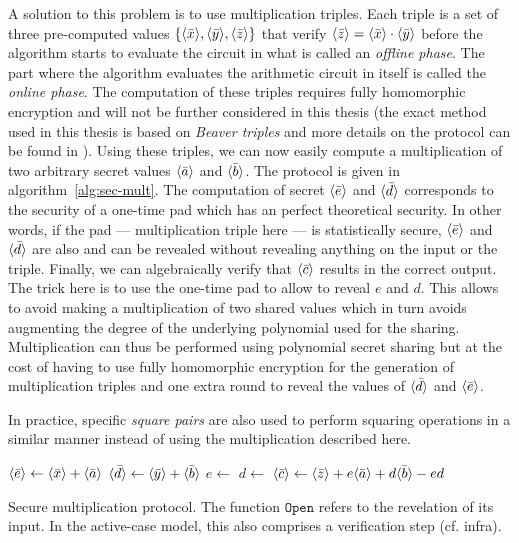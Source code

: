 A solution to this problem is to use multiplication triples. Each triple is a set of three pre-computed values $\left\{ \langle \bar{x} \rangle, \langle \bar{y} \rangle, \langle \bar{z} \rangle \right\}$ that verify $\langle \bar{z} \rangle=\langle \bar{x} \rangle\cdot \langle \bar{y} \rangle$ before the algorithm starts to evaluate the circuit in what is called an \emph{offline phase}. The part where the algorithm evaluates the arithmetic circuit in itself is called the \emph{online phase}. The computation of these triples requires fully homomorphic encryption and will not be further considered in this thesis (the exact method used in this thesis is based on \emph{Beaver triples} and more details on the protocol can be found in ). Using these triples, we can now easily compute a multiplication of two arbitrary secret values $\langle \bar{a} \rangle$ and $\langle \bar{b} \rangle$. The protocol is given in algorithm~\ref{alg:sec-mult}. The computation of secret $\langle \bar{e} \rangle$ and $\langle \bar{d} \rangle$ corresponds to the security of a one-time pad which has an perfect theoretical security. In other words, if the pad --- multiplication triple here --- is statistically secure, $\langle \bar{e} \rangle$ and $\langle \bar{d} \rangle$ are also and can be revealed without revealing anything on the input or the triple. Finally, we can algebraically verify that $\langle \bar{c} \rangle$ results in the correct output. The trick here is to use the one-time pad to allow to reveal $e$ and $d$. This allows to avoid making a multiplication of two shared values which in turn avoids augmenting the degree of the underlying polynomial used for the sharing. Multiplication can thus be performed using polynomial secret sharing but at the cost of having to use fully homomorphic encryption for the generation of multiplication triples and one extra round to reveal the values of $\langle \bar{d} \rangle$ and $\langle \bar{e} \rangle$.

In practice, specific \emph{square pairs} are also used to perform squaring operations in a similar manner instead of using the multiplication described here.

\begin{center}
\begin{algorithm}[H]
\DontPrintSemicolon
{}
$\langle \bar{e} \rangle \leftarrow \langle \bar{x} \rangle+\langle \bar{a} \rangle$ \;
$\langle \bar{d} \rangle \leftarrow \langle \bar{y} \rangle+\langle \bar{b} \rangle$ \;
$e \leftarrow$  \;
$d \leftarrow$  \;
$\langle \bar{c} \rangle \leftarrow \langle \bar{z} \rangle + e\langle \bar{a} \rangle + d\langle \bar{b} \rangle - ed$ \;
\caption{Secure multiplication protocol. The function $\mathtt{Open}$ refers to the revelation of its input. In the active-case model, this also comprises a verification step (cf. infra).}
\label{alg:sec-mult}
\end{algorithm}
\end{center}

